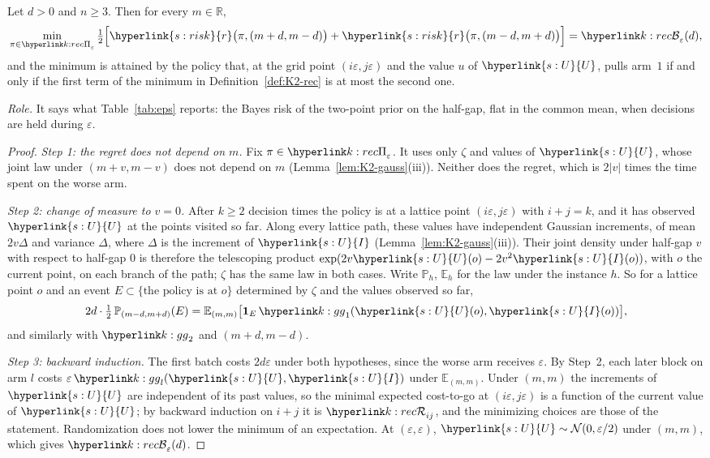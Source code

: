 \documentclass[11pt]{article}
\DeclareRobustCommand{\sy}[2]{{\hyperlink{#1}{#2}}}
\newcommand{\R}{\mathbb{R}}
\newcommand{\E}{\mathbb{E}}
\renewcommand{\P}{\mathbb{P}}
\newcommand{\1}{\mathbf{1}}
\newcommand{\rk}{\sy{s:risk}{r}}
\newcommand{\Ud}{\sy{s:U}{U}}
\newcommand{\Id}{\sy{s:U}{I}}
\begin{document}
\begin{lemma}\label{lem:K2-dp}
Let $d>0$ and $n\ge3$. Then for every $m\in\R$,
\[
\min_{\pi\in\kPi_\varepsilon}\tfrac12\Big[\rk\big(\pi,(m+d,m-d)\big)+\rk\big(\pi,(m-d,m+d)\big)\Big]=\kB_\varepsilon(d),
\]
and the minimum is attained by the policy that, at the grid point $(i\varepsilon,j\varepsilon)$ and the value $u$ of $\Ud$, pulls arm~$1$ if and only if the first term of the
minimum in Definition~\ref{def:K2-rec} is at most the second one.
\end{lemma}
\noindent\textit{Role.} It says what Table~\ref{tab:eps} reports: the Bayes risk of the two-point prior on the half-gap, flat in the common mean, when decisions are
held during $\varepsilon$.
\begin{proof}
\textit{Step 1: the regret does not depend on $m$.} Fix $\pi\in\kPi_\varepsilon$. It uses only $\zeta$ and values of $\Ud$, whose joint law under $(m+v,m-v)$ does not depend
on $m$ (Lemma~\ref{lem:K2-gauss}(iii)). Neither does the regret, which is $2|v|$ times the time spent on the worse arm.

\textit{Step 2: change of measure to $v=0$.} After $k\ge2$ decision times the policy is at a lattice point $(i\varepsilon,j\varepsilon)$ with $i+j=k$, and it has observed
$\Ud$ at the points visited so far. Along every lattice path, these values have independent Gaussian increments, of mean $2v\Delta$ and variance $\Delta$, where
$\Delta$ is the increment of $\Id$ (Lemma~\ref{lem:K2-gauss}(iii)). Their joint density under half-gap $v$ with respect to half-gap $0$ is therefore the telescoping
product $\exp(2v\Ud(o)-2v^2\Id(o))$, with $o$ the current point, on each branch of the path; $\zeta$ has the same law in both cases. Write $\P_h$, $\E_h$ for the law
under the instance $h$. So for a lattice point $o$ and an event $E\subset\{\text{the policy is at }o\}$ determined by $\zeta$ and the values observed so far,
\[
2d\cdot\tfrac12\,\P_{(m-d,m+d)}(E)=\E_{(m,m)}\big[\1_E\,\kg_1(\Ud(o),\Id(o))\big],
\]
and similarly with $\kg_2$ and $(m+d,m-d)$.

\textit{Step 3: backward induction.} The first batch costs $2d\varepsilon$ under both hypotheses, since the worse arm receives $\varepsilon$. By Step~2, each later block on arm $l$
costs $\varepsilon\,\kg_l(\Ud,\Id)$ under $\E_{(m,m)}$. Under $(m,m)$ the increments of $\Ud$ are independent of its past values, so the minimal expected cost-to-go at
$(i\varepsilon,j\varepsilon)$ is a function of the current value of $\Ud$; by backward induction on $i+j$ it is $\kR_{ij}$, and the minimizing choices are those of the statement.
Randomization does not lower the minimum of an expectation. At $(\varepsilon,\varepsilon)$, $\Ud\sim\mathcal N(0,\varepsilon/2)$ under $(m,m)$, which gives $\kB_\varepsilon(d)$.
\end{proof}
\end{document}
